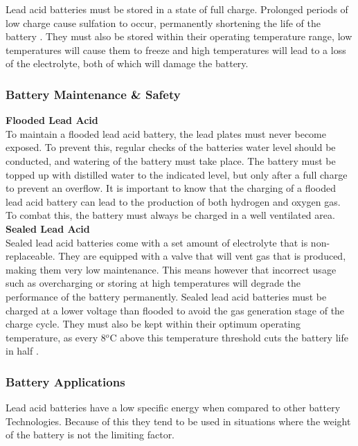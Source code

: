 \documentclass[a4paper,11pt]{article}
\begin{document}
\begin{multicols}{2}
Lead acid batteries must be stored in a state of full charge. Prolonged periods of low charge cause sulfation to occur, permanently shortening the life of the battery \cite{sulfation}. They must also be stored within their operating temperature range, low temperatures will cause them to freeze and high temperatures will lead to a loss of the electrolyte, both of which will damage the battery.

\subsubsection{Battery Maintenance \& Safety}

\textbf{Flooded Lead Acid}\\
To maintain a flooded lead acid battery, the lead plates must never become exposed. To prevent this, regular checks of the batteries water level should be conducted, and watering of the battery must take place. The battery must be topped up with distilled water to the indicated level, but only after a full charge to prevent an overflow.
It is important to know that the charging of a flooded lead acid battery can lead to the production of both hydrogen and oxygen gas. To combat this, the battery must always be charged in a well ventilated area. \\

\textbf{Sealed Lead Acid}\\
Sealed lead acid batteries come with a set amount of electrolyte that is non-replaceable. They are equipped with a valve that will vent gas that is produced, making them very low maintenance. This means however that incorrect usage such as overcharging or storing at high temperatures will degrade the performance of the battery permanently. Sealed lead acid batteries must be charged at a lower voltage than flooded to avoid the gas generation stage of the charge cycle. They must also be kept within their optimum operating temperature, as every 8$^o$C above this temperature threshold cuts the battery life in half \cite{lead_acid}.

\subsubsection{Battery Applications}

Lead acid batteries have a low specific energy when compared to other battery Technologies. Because of this they tend to be used in situations where the weight of the battery is not the limiting factor.


\end{multicols}
\end{document}
